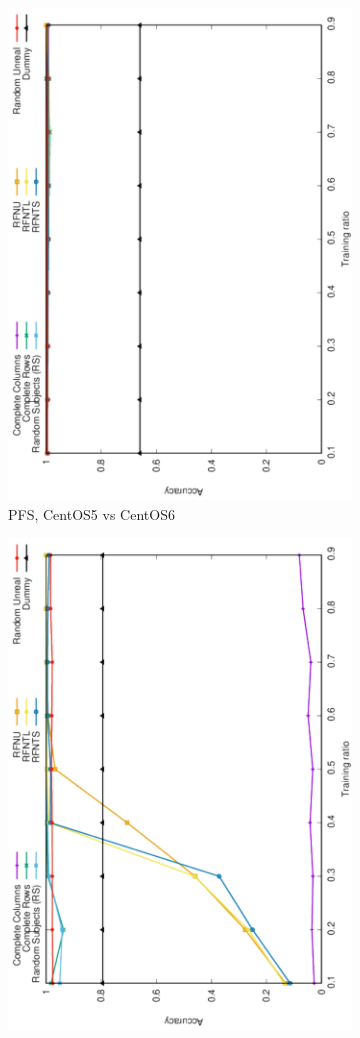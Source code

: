 \documentclass[10pt, conference, compsocconf]{IEEEtran}
\begin{document}
\begin{figure}
\begin{subfigure}[b]{0.4\linewidth}
        \includegraphics[width=0.8\columnwidth, angle=-90]{data/results/means_of_results/ALS-Bias/PreFreeSurfer/ALS-Bias-PFS-5v6.pdf}
        \caption{PFS, CentOS5 vs CentOS6}
\end{subfigure}
\begin{subfigure}[b]{0.4\linewidth}
        \includegraphics[width=0.8\columnwidth, angle=-90]{data/results/means_of_results/ALS-Bias/PreFreeSurfer/ALS-Bias-PFS-5v7.pdf}

\end{subfigure}
\end{figure}
\end{document}
